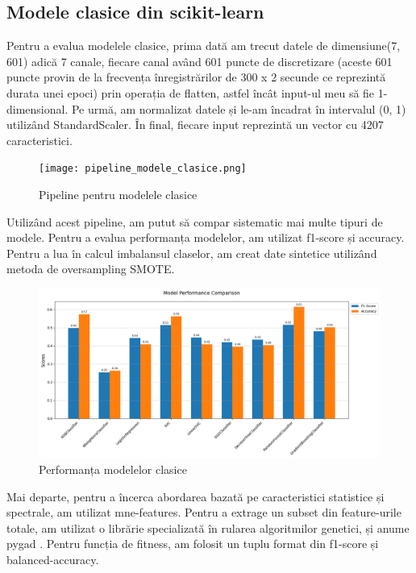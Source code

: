 \subsection{Modele clasice din scikit-learn}
Pentru a evalua modelele clasice, prima dată am trecut datele de dimensiune(7, 601) adică 7 canale, fiecare canal având 601 puncte de discretizare (aceste 601 puncte provin de la frecvența înregistrărilor de 300 x 2 secunde ce reprezintă durata unei epoci) prin operația de flatten, astfel încât input-ul meu să fie 1-dimensional. Pe urmă, am normalizat datele și le-am încadrat în intervalul (0, 1) utilizând StandardScaler. În final, fiecare input reprezintă un vector cu 4207 caracteristici.

\vspace{1em}
\begin{figure}[h]
    \centering
    \texttt{[image: pipeline\_modele\_clasice.png]}
    \caption{Pipeline pentru modelele clasice}
    \label{fig:enter-label}
\end{figure}

Utilizând acest pipeline, am putut să compar sistematic mai multe tipuri de modele. Pentru a evalua performanța modelelor, am utilizat f1-score și accuracy. Pentru a lua în calcul imbalansul claselor, am creat date sintetice utilizând metoda de oversampling SMOTE. %

\clearpage
\vspace{1em}
\begin{figure}[h]
    \centering
    \includegraphics[width=1\textwidth]{images/comparatie_modele_clasice_unweighted.png}
    \caption{Performanța modelelor clasice}
    \label{fig:enter-label}
\end{figure}

Mai departe, pentru a încerca abordarea bazată pe caracteristici statistice și spectrale, am utilizat mne-features. Pentru a extrage un subset din feature-urile totale, am utilizat o librărie specializată în rularea algoritmilor genetici, și anume pygad \cite{pygad}. Pentru funcția de fitness, am folosit un tuplu format din f1-score și balanced-accuracy.

